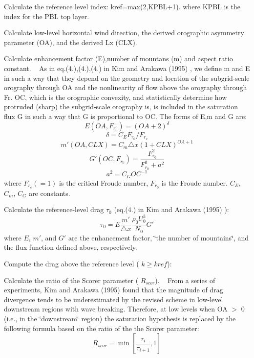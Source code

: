 \begin{DoxyItemize}
\item Calculate the reference level index\+: kref=max(2,K\+P\+B\+L+1). where K\+P\+BL is the index for the P\+BL top layer.
\item Calculate low-\/level horizontal wind direction, the derived orographic asymmetry parameter (OA), and the derived Lx (C\+LX).
\item Calculate enhancement factor (E),number of mountans (m\textquotesingle{}) and aspect ratio constant. ~\newline
 As in eq.(4.),(4.),(4.) in Kim and Arakawa (1995) \cite{kim_and_arakawa_1995}, we define m\textquotesingle{} and E in such a way that they depend on the geometry and location of the subgrid-\/scale orography through OA and the nonlinearity of flow above the orography through Fr. OC, which is the orographic convexity, and statistically determine how protruded (sharp) the subgrid-\/scale orography is, is included in the saturation flux G\textquotesingle{} in such a way that G\textquotesingle{} is proportional to OC. The forms of E,m\textquotesingle{} and G\textquotesingle{} are\+: \[ E(OA,F_{r_{0}})=(OA+2)^{\delta} \] \[ \delta=C_{E}F_{r_{0}}/F_{r_{c}} \] \[ m'(OA,CLX)=C_{m}\triangle x(1+CLX)^{OA+1} \] \[ G'(OC,F_{r_{0}})=\frac{F_{r_{0}}^2}{F_{r_{0}}^2+a^{2}} \] \[ a^{2}=C_{G}OC^{-1} \] where $F_{r_{c}}(=1)$ is the critical Froude number, $F_{r_{0}}$ is the Froude number. $C_{E}$, $C_{m}$, $C_{G}$ are constants.
\item Calculate the reference-\/level drag $\tau_{0}$ (eq.(4.) in Kim and Arakawa (1995) \cite{kim_and_arakawa_1995})\+: \[ \tau_0=E\frac{m'}{\triangle x}\frac{\rho_{0}U_0^3}{N_{0}}G' \] where $E$, $m'$, and $G'$ are the enhancement factor, \char`\"{}the number of mountains\char`\"{}, and the flux function defined above, respectively.
\item Compute the drag above the reference level ( $k\geq kref$)\+:
\begin{DoxyItemize}
\item Calculate the ratio of the Scorer parameter ( $R_{scor}$). ~\newline
 From a series of experiments, Kim and Arakawa (1995) \cite{kim_and_arakawa_1995} found that the magnitude of drag divergence tends to be underestimated by the revised scheme in low-\/level downstream regions with wave breaking. Therefore, at low levels when OA $>$ 0 (i.\+e., in the \char`\"{}downstream\char`\"{} region) the saturation hypothesis is replaced by the following formula based on the ratio of the the Scorer parameter\+: \[ R_{scor}=\min \left[\frac{\tau_i}{\tau_{i+1}},1\right] \]

\end{DoxyItemize}
\end{DoxyItemize}
